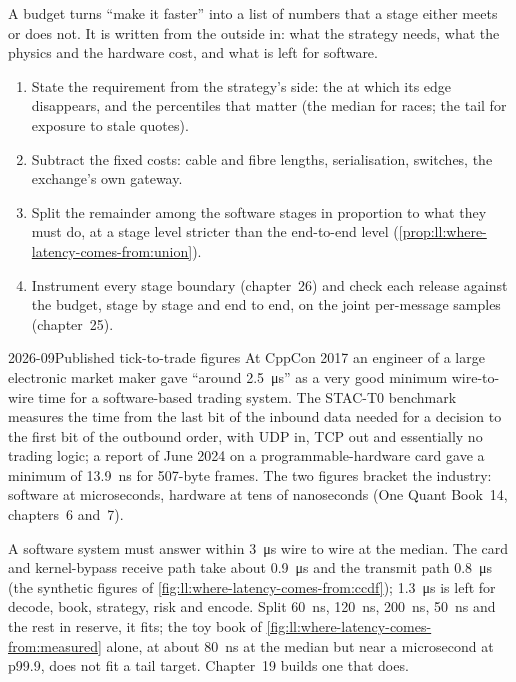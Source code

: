 A budget turns ``make it faster'' into a list of numbers that a stage either meets or does not. It is written from
the outside in: what the strategy needs, what the physics and the hardware cost, and what is left for software.

\begin{method}\label{met:ll:where-latency-comes-from:budget}
\begin{enumerate}
\item State the requirement from the strategy's side: the  at which its edge disappears, and the
percentiles that matter (the median for races; the tail for exposure to stale quotes).
\item Subtract the fixed costs: cable and fibre lengths, serialisation, switches, the exchange's own gateway.
\item Split the remainder among the software stages in proportion to what they must do, at a stage level stricter
than the end-to-end level (\cref{prop:ll:where-latency-comes-from:union}).
\item Instrument every stage boundary (chapter~26) and check each release against the budget, stage by stage and end
to end, on the joint per-message samples (chapter~25).
\end{enumerate}
\end{method}

\begin{dated}{2026-09}{Published tick-to-trade figures}\label{dat:ll:where-latency-comes-from:published}
At CppCon 2017 an engineer of a large electronic market maker gave ``around \qty{2.5}{\micro\second}'' as a very
good minimum wire-to-wire time for a software-based trading system. The STAC-T0 benchmark measures the time from the
last bit of the inbound data needed for a decision to the first bit of the outbound order, with UDP in, TCP out and
essentially no trading logic; a report of June 2024 on a programmable-hardware card gave a minimum of
\qty{13.9}{\nano\second} for 507-byte frames. The two figures bracket the industry: software at microseconds,
hardware at tens of nanoseconds (One Quant Book~14, chapters~6 and~7).
\end{dated}

\begin{example}\label{ex:ll:where-latency-comes-from:budget}
A software system must answer within \qty{3}{\micro\second} wire to wire at the median. The card and kernel-bypass
receive path take about \qty{0.9}{\micro\second} and the transmit path \qty{0.8}{\micro\second} (the synthetic
figures of \cref{fig:ll:where-latency-comes-from:ccdf}); \qty{1.3}{\micro\second} is left for decode, book, strategy,
risk and encode. Split \qty{60}{\nano\second}, \qty{120}{\nano\second}, \qty{200}{\nano\second},
\qty{50}{\nano\second} and the rest in reserve, it fits; the toy book of \cref{fig:ll:where-latency-comes-from:measured}
alone, at about \qty{80}{\nano\second} at the median but near a microsecond at p99.9, does not fit a tail
target. Chapter~19 builds one that does.
\end{example}

